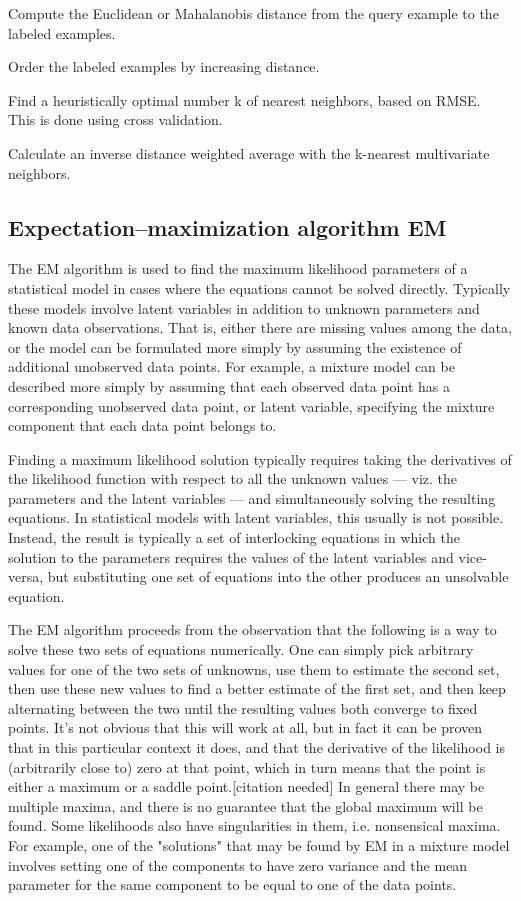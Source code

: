 \documentclass[12pt]{book}
\begin{document}
\begin{itemize*}
  \item Compute the Euclidean or Mahalanobis distance from the query example to the labeled examples.
  \item Order the labeled examples by increasing distance.
  \item Find a heuristically optimal number k of nearest neighbors, based on RMSE. This is done using cross validation.
  \item Calculate an inverse distance weighted average with the k-nearest multivariate neighbors.
\end{itemize*}

\subsection{Expectation–maximization algorithm EM}
The EM algorithm is used to find the maximum likelihood parameters of a statistical model in cases where the equations cannot be solved directly. Typically these models involve latent variables 
in addition to unknown parameters and known data observations. That is, either there are missing values among the data, or the model can be formulated more simply by assuming the existence of 
additional unobserved data points. For example, a mixture model can be described more simply by assuming that each observed data point has a corresponding unobserved data point, or latent variable, 
specifying the mixture component that each data point belongs to.

Finding a maximum likelihood solution typically requires taking the derivatives of the likelihood function with respect to all the unknown values — viz. the parameters and the latent variables — 
and simultaneously solving the resulting equations. In statistical models with latent variables, this usually is not possible. Instead, the result is typically a set of interlocking equations in 
which the solution to the parameters requires the values of the latent variables and vice-versa, but substituting one set of equations into the other produces an unsolvable equation.

The EM algorithm proceeds from the observation that the following is a way to solve these two sets of equations numerically. One can simply pick arbitrary values for one of the two sets of unknowns, 
use them to estimate the second set, then use these new values to find a better estimate of the first set, and then keep alternating between the two until the resulting values both converge to fixed 
points. It's not obvious that this will work at all, but in fact it can be proven that in this particular context it does, and that the derivative of the likelihood is (arbitrarily close to) zero at 
that point, which in turn means that the point is either a maximum or a saddle point.[citation needed] In general there may be multiple maxima, and there is no guarantee that the global maximum will 
be found. Some likelihoods also have singularities in them, i.e. nonsensical maxima. For example, one of the "solutions" that may be found by EM in a mixture model involves setting one of the 
components to have zero variance and the mean parameter for the same component to be equal to one of the data points.
\end{document}
